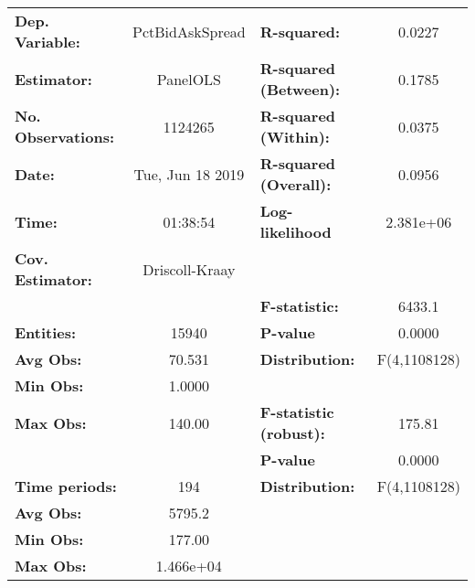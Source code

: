 \begin{center}
\begin{tabular}{lclc}
\toprule
\textbf{Dep. Variable:}                 &  PctBidAskSpread   & \textbf{  R-squared:         }   &      0.0227      \\
\textbf{Estimator:}                     &      PanelOLS      & \textbf{  R-squared (Between):}  &      0.1785      \\
\textbf{No. Observations:}              &      1124265       & \textbf{  R-squared (Within):}   &      0.0375      \\
\textbf{Date:}                          &  Tue, Jun 18 2019  & \textbf{  R-squared (Overall):}  &      0.0956      \\
\textbf{Time:}                          &      01:38:54      & \textbf{  Log-likelihood     }   &    2.381e+06     \\
\textbf{Cov. Estimator:}                &   Driscoll-Kraay   & \textbf{                     }   &                  \\
\textbf{}                               &                    & \textbf{  F-statistic:       }   &      6433.1      \\
\textbf{Entities:}                      &       15940        & \textbf{  P-value            }   &      0.0000      \\
\textbf{Avg Obs:}                       &       70.531       & \textbf{  Distribution:      }   &   F(4,1108128)   \\
\textbf{Min Obs:}                       &       1.0000       & \textbf{                     }   &                  \\
\textbf{Max Obs:}                       &       140.00       & \textbf{  F-statistic (robust):} &      175.81      \\
\textbf{}                               &                    & \textbf{  P-value            }   &      0.0000      \\
\textbf{Time periods:}                  &        194         & \textbf{  Distribution:      }   &   F(4,1108128)   \\
\textbf{Avg Obs:}                       &       5795.2       & \textbf{                     }   &                  \\
\textbf{Min Obs:}                       &       177.00       & \textbf{                     }   &                  \\
\textbf{Max Obs:}                       &     1.466e+04      & \textbf{                     }   &                  \\

\end{tabular}
\end{center}

